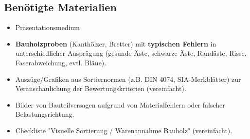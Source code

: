 \documentclass[12pt, a4paper]{article}
\begin{document}
\subsection{Benötigte Materialien}
\begin{itemize}
    \item Präsentationsmedium
    \item \textbf{Bauholzproben} (Kanthölzer, Bretter) mit \textbf{typischen Fehlern} in unterschiedlicher Ausprägung (gesunde Äste, schwarze Äste, Randäste, Risse, Faserabweichung, evtl. Bläue).
    \item Auszüge/Grafiken aus Sortiernormen (z.B. DIN 4074, SIA-Merkblätter) zur Veranschaulichung der Bewertungskriterien (vereinfacht).
    \item Bilder von Bauteilversagen aufgrund von Materialfehlern oder falscher Belastungsrichtung.
    \item Checkliste "Visuelle Sortierung / Warenannahme Bauholz" (vereinfacht).
\end{itemize}
\end{document}
